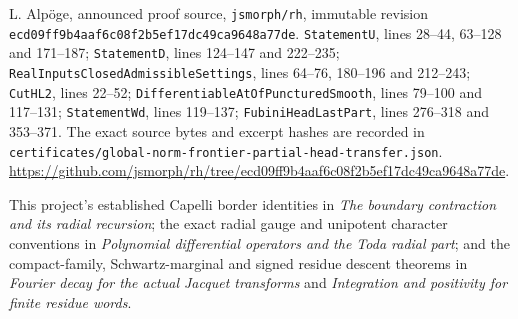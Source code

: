 L. Alp\"oge, announced proof source, \texttt{jsmorph/rh}, immutable
revision \texttt{ecd09ff9b4aaf6c08f2b5ef17dc49ca9648a77de}.
\texttt{StatementU}, lines 28--44, 63--128 and 171--187;
\texttt{StatementD}, lines 124--147 and 222--235;
\texttt{RealInputsClosedAdmissibleSettings}, lines 64--76,
180--196 and 212--243;
\texttt{CutHL2}, lines 22--52;
\texttt{DifferentiableAtOfPuncturedSmooth}, lines 79--100 and 117--131;
\texttt{StatementWd}, lines 119--137;
\texttt{FubiniHeadLastPart}, lines 276--318 and 353--371.
The exact source bytes and excerpt hashes are recorded in
\texttt{certificates/global-norm-frontier-partial-head-transfer.json}.
\url{https://github.com/jsmorph/rh/tree/ecd09ff9b4aaf6c08f2b5ef17dc49ca9648a77de}.

This project's established Capelli border identities in
\emph{The boundary contraction and its radial recursion};
the exact radial gauge and unipotent character conventions in
\emph{Polynomial differential operators and the Toda radial part};
and the compact-family, Schwartz-marginal and signed residue
descent theorems in \emph{Fourier decay for the actual Jacquet
transforms} and \emph{Integration and positivity for finite residue words}.
